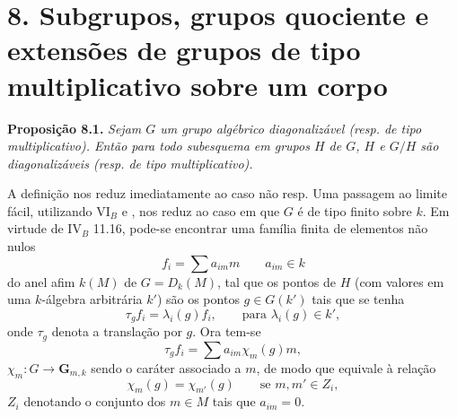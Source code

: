 
\begingroup
\renewcommand{\thefootnote}{*}
\renewcommand{\theHfootnote}{ix-section-eight-star}
\section*{8. Subgrupos, grupos quociente e extensões de grupos de
tipo multiplicativo sobre um corpo\protect\footnotemark}
\endgroup

%

\medskip
\noindent{}\textbf{Proposição 8.1.}
\textit{Sejam \(G\) um grupo algébrico diagonalizável
(resp. de tipo multiplicativo). Então para todo
subesquema em grupos \(H\) de \(G\), \(H\) e \(G/H\)
são diagonalizáveis (resp. de tipo multiplicativo).}

A definição 
nos reduz imediatamente ao caso não resp. Uma passagem
ao limite fácil, utilizando VI\(_B\)
 e
, nos reduz
ao caso em que \(G\) é de tipo finito sobre \(k\).
Em virtude de IV\(_B\) 11.16, pode-se
encontrar uma família finita de elementos não nulos
\begin{equation}
  \tag{8.1.1}
  f_i=\sum a_{im}m\qquad a_{im}\in k
\end{equation}
do anel afim \(k(M)\) de \(G=D_k(M)\), tal que os
pontos de \(H\) (com valores em uma \(k\)-álgebra
arbitrária \(k'\)) são os pontos \(g\in G(k')\) tais
que se tenha
\begin{equation}
  \tag{8.1.2}
  \tau_g f_i=\lambda_i(g)f_i,
  \qquad\text{para }\lambda_i(g)\in k',
\end{equation}
onde \(\tau_g\) denota a translação por \(g\). Ora tem-se
\begin{equation}
  \tag{8.1.3}
  \tau_g f_i=\sum a_{im}\chi_m(g)m,
\end{equation}
\(\chi_m:G\to\mathbf G_{m,k}\) sendo o caráter associado
a \(m\), de modo que
 equivale à relação
\begin{equation}
  \tag{8.1.4}
  \chi_m(g)=\chi_{m'}(g)
  \qquad\text{se }m,m'\in Z_i,
\end{equation}
\(Z_i\) denotando o conjunto dos \(m\in M\) tais que
\(a_{im}=0\).

